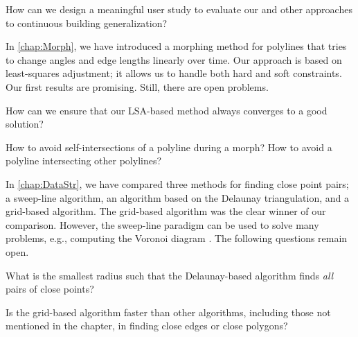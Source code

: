 \begin{open}
  How can we design a meaningful user study to evaluate our and other
  approaches to continuous building generalization?
\end{open}

In \chap\ref{chap:Morph}, we have introduced a morphing method 
for polylines that tries 
to change angles and edge lengths linearly over time. 
Our approach is based on least-squares adjustment;
it allows us to handle both hard and soft constraints. 
Our first results are promising. 
Still, there are open problems. 

\begin{open}
  How can we ensure that our LSA-based method always converges to a
  good solution?
\end{open}

\begin{open}
  How to avoid self-intersections of a polyline during a morph?  How
  to avoid a polyline intersecting other polylines?
\end{open}

In \chap\ref{chap:DataStr}, we have compared three methods
for finding close point pairs; a sweep-line algorithm, 
an algorithm based on the Delaunay triangulation, 
and a grid-based algorithm.
The grid-based algorithm was 
the clear winner of our comparison.
However, the sweep-line paradigm 
can be used to solve many problems,
e.g., computing the Voronoi diagram 
\parencite{Fortune1987Voronoi}.
The following questions remain open.

\begin{open}
  What is the smallest radius such that the Delaunay-based algorithm
  finds \emph{all} pairs of close points?
\end{open}

\begin{open}
  Is the grid-based algorithm faster than other algorithms, including
  those not mentioned in the chapter, in finding close edges or close
  polygons?
\end{open}

